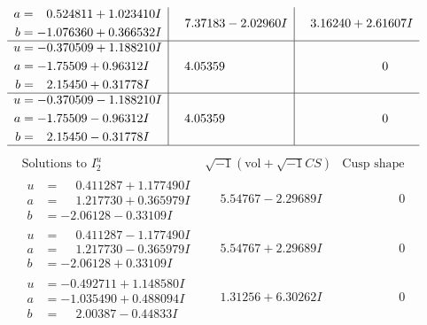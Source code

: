 \documentclass[1p]{elsarticle_modified}
\theoremstyle{definition}
\newcommand{\I}{\sqrt{-1}}
\begin{document}
$$\begin{array}{c|c|c}
\begin{aligned}
a &= \phantom{-}0.524811 + 1.023410 I \\
b &= -1.076360 + 0.366532 I\end{aligned}
 & \phantom{-}7.37183 - 2.02960 I & \phantom{-}3.16240 + 2.61607 I \\ \hline\begin{aligned}
u &= -0.370509 + 1.188210 I \\
a &= -1.75509 + 0.96312 I \\
b &= \phantom{-}2.15450 + 0.31778 I\end{aligned}
 & \phantom{-}4.05359\phantom{ +0.000000I} & \phantom{-0.000000 } 0 \\ \hline\begin{aligned}
u &= -0.370509 - 1.188210 I \\
a &= -1.75509 - 0.96312 I \\
b &= \phantom{-}2.15450 - 0.31778 I\end{aligned}
 & \phantom{-}4.05359\phantom{ +0.000000I} & \phantom{-0.000000 } 0\\
 \hline 
 \end{array}$$\newpage$$\begin{array}{c|c|c}  
\text{Solutions to }I^u_{2}& \I (\text{vol} + \sqrt{-1}CS) & \text{Cusp shape}\\
 \hline 
\begin{aligned}
u &= \phantom{-}0.411287 + 1.177490 I \\
a &= \phantom{-}1.217730 + 0.365979 I \\
b &= -2.06128 - 0.33109 I\end{aligned}
 & \phantom{-}5.54767 - 2.29689 I & \phantom{-0.000000 } 0 \\ \hline\begin{aligned}
u &= \phantom{-}0.411287 - 1.177490 I \\
a &= \phantom{-}1.217730 - 0.365979 I \\
b &= -2.06128 + 0.33109 I\end{aligned}
 & \phantom{-}5.54767 + 2.29689 I & \phantom{-0.000000 } 0 \\ \hline\begin{aligned}
u &= -0.492711 + 1.148580 I \\
a &= -1.035490 + 0.488094 I \\
b &= \phantom{-}2.00387 - 0.44833 I\end{aligned}
 & \phantom{-}1.31256 + 6.30262 I & \phantom{-0.000000 } 0 \\ \hline\begin{aligned}

\end{aligned}
\end{array}$$
\end{document}
